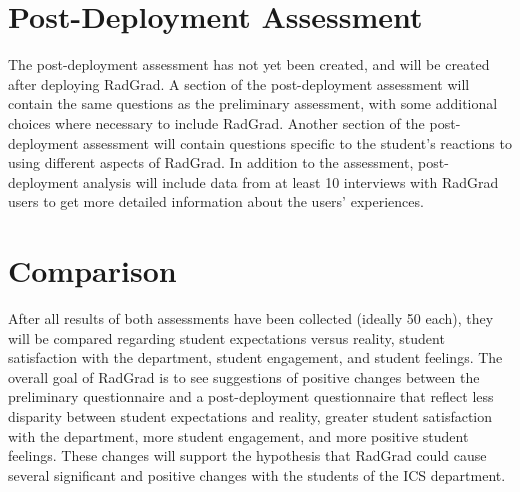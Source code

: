 \section{Post-Deployment Assessment}
The post-deployment assessment has not yet been created, and will be created after deploying RadGrad. A section of the post-deployment assessment will contain the same questions as the preliminary assessment, with some additional choices where necessary to include RadGrad. Another section of the post-deployment assessment will contain questions specific to the student's reactions to using different aspects of RadGrad. In addition to the assessment, post-deployment analysis will include data from at least 10 interviews with RadGrad users to get more detailed information about the users' experiences.

\section{Comparison}
After all results of both assessments have been collected (ideally 50 each), they will be compared regarding student expectations versus reality, student satisfaction with the department, student engagement, and student feelings. The overall goal of RadGrad is to see suggestions of positive changes between the preliminary questionnaire and a post-deployment questionnaire that reflect less disparity between student expectations and reality, greater student satisfaction with the department, more student engagement, and more positive student feelings. These changes will support the hypothesis that RadGrad could cause several significant and positive changes with the students of the ICS department.